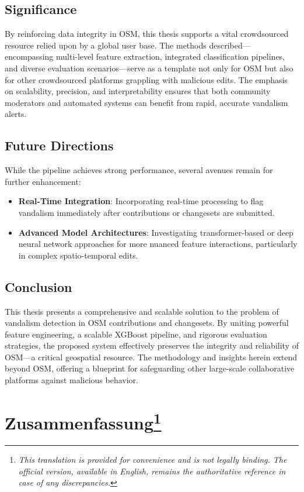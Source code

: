 \documentclass[
    13pt, %
    a4paper, %
    listof=totoc, %
    bibliography=totoc, %
    index=totoc, %
    headsepline
]{scrreprt}
\begin{document}
\subsection*{Significance}
\noindent
By reinforcing data integrity in OSM, this thesis supports a vital crowdsourced resource relied upon by a global user base. The methods described—encompassing multi-level feature extraction, integrated classification pipelines, and diverse evaluation scenarios—serve as a template not only for OSM but also for other crowdsourced platforms grappling with malicious edits. The emphasis on scalability, precision, and interpretability ensures that both community moderators and automated systems can benefit from rapid, accurate vandalism alerts.

\subsection*{Future Directions}
\noindent
While the pipeline achieves strong performance, several avenues remain for further enhancement:
\begin{itemize}
  \item \textbf{Real-Time Integration}: Incorporating real-time processing to flag vandalism immediately after contributions or changesets are submitted.
  \item \textbf{Advanced Model Architectures}: Investigating transformer-based or deep neural network approaches for more nuanced feature interactions, particularly in complex spatio-temporal edits.
\end{itemize}

\subsection*{Conclusion}
\noindent
This thesis presents a comprehensive and scalable solution to the problem of vandalism detection in OSM contributions and changesets. By uniting powerful feature engineering, a scalable XGBoost pipeline, and rigorous evaluation strategies, the proposed system effectively preserves the integrity and reliability of OSM—a critical geospatial resource. The methodology and insights herein extend beyond OSM, offering a blueprint for safeguarding other large-scale collaborative platforms against malicious behavior.


\newpage
\section*{\LARGE Zusammenfassung\footnote{\textit{This translation is provided for convenience and is not legally binding. The official version, available in English, remains the authoritative reference in case of any discrepancies.}}}
\label{sec:german_summary}
\end{document}
